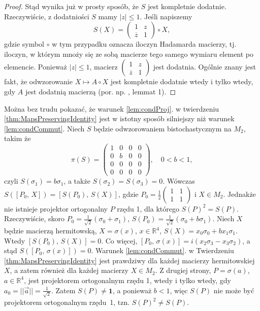 \begin{proof}
Stąd wynika już w prosty sposób, że $S$ jest kompletnie dodatnie.
Rzeczywiście,
z dodatniości $S$ mamy $|z| \leq 1$.
Jeśli napiszemy
\begin{equation}
S(X) =
\begin{pmatrix}
1 & z \\ \overline{z} & 1
\end{pmatrix} \circ X,
\end{equation}
gdzie symbol $\circ$ w tym przypadku oznacza iloczyn Hadamarda macierzy,
tj. iloczyn, w którym mnoży się ze sobą macierze tego samego wymiaru
element po elemencie.
Ponieważ $|z| \leq 1$, macierz
$
\left(
\begin{smallmatrix} 1 & z \\ \overline{z} & 1 \end{smallmatrix}
\right)$
jest dodatnia.
Ogólnie znany jest fakt, że odwzorowanie $X \mapsto A \circ X$
jest kompletnie dodatnie wtedy i tylko wtedy, gdy $A$
jest dodatnią macierzą
(por. np. \cite{besenyei2011completely}, lemmat 1).
\end{proof}

\begin{Example}
Można bez trudu pokazać, że warunek \ref{lem:condProj}. w
twierdzeniu \ref{thm:MapsPreservingIdentity} jest w istotny sposób silniejszy
niż warunek \ref{lem:condCommut}.
Niech $S$ będzie odwzorowaniem bistochastycznym na $M_{2}$, takim że
\begin{equation}
\label{RandomLabel:514431}
    \pi(S) = \begin{pmatrix}
    1 & 0 & 0 & 0 \\
    0 & b & 0 & 0 \\
    0 & 0 & 0 & 0 \\
    0 & 0 & 0 & 0
    \end{pmatrix},
    \quad 0 < b < 1,
\end{equation}
czyli $S(\sigma_{1}) = b \sigma_{1}$, a także
$S(\sigma_{2}) = S(\sigma_{3}) = 0$.
Wówczas $S\left( [P_{0}, \, X ] \right) = [ S(P_{0}), \, S(X) ]$,
gdzie
$P_{0}= \frac{1}{2} \left( \begin{smallmatrix}
 1 & 1 \\ 1 & 1
 \end{smallmatrix} \right)$ i $X \in M_{2}$.
Jednakże nie istnieje projektor ortogonalny $P$ rzędu 1,
dla którego $S(P)^{2} = S(P)$.
Rzeczywiście, skoro
$P_{0} = \frac{1}{\sqrt{2}}(\sigma_{0} + \sigma_{1})$,
$S(P_{0}) = \frac{1}{\sqrt{2}}(\sigma_{0} + b \sigma_{1})$.
Niech $X$ będzie macierzą hermitowską, $X = \sigma(x)$, $x \in \mathbb{R}^{4}$,
$S(X) = x_{0} \sigma_{0} + b x_{1} \sigma_{1}$.
Wtedy $[S(P_{0}), \, S(X) ] =0$.
Co więcej,
$[P_{0}, \, \sigma(x)] =
i(x_{2} \sigma_{3} - x_{3} \sigma_{2})$,
a stąd
$S([P_{0}, \, \sigma(x)]) = 0$.
Warunek \ref{lem:condCommut}. w Twierdzeniu \ref{thm:MapsPreservingIdentity}
jest prawdziwy dla każdej macierzy hermitowskiej $X$,
a zatem również dla każdej macierzy $X \in M_{2}$.
Z drugiej strony,
$P = \sigma(a)$, $a \in \mathbb{R}^{4}$, jest projektorem ortogonalnym
rzędu 1,
wtedy i tylko wtedy, gdy $a_{0} = ||\vec{a}|| = \frac{1}{\sqrt{2}}$.
Zatem $S(P) \neq \mathbf{1}$, a ponieważ $b<1$,
więc $S(P)$ nie może być projektorem ortogonalnym \mbox{rzędu 1},
tzn. $S(P)^{2} \neq S(P)$.
\end{Example}

